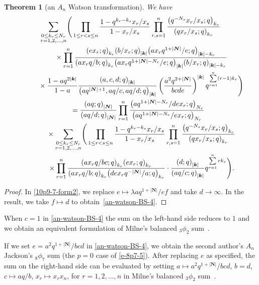 \documentclass[pdftex]{sigma}
\numberwithin{equation}{section}
\newtheorem{Theorem}{Theorem}[section]
\newcommand{\sumN}{{\left| \boldsymbol{N} \right|}}
\newcommand\sumk{{\left| \boldsymbol{k} \right|}}
\newcommand{\multsum}[3]{{\sum\limits_{\substack{{0\le #1_#3 \le #2_#3} \\
{#3 =1,2,\dots, n}}}}}
\newcommand{\qrfac}[2]{{\left({#1}; q\right)_{#2}}} %
\newcommand{\triprod}[1]{\prod\limits_{1\le r < s \le #1}}
\newcommand{\sqprod}[1]{\prod\limits_{r, s =1}^{#1}} %
\newcommand{\smallprod}[1]{\prod\limits_{r =1}^{#1}} %
\newcommand{\xover}[1]{#1_{r}/#1_{s}}
\newcommand{\vandermonde}[3]{\triprod{#3} %
 \frac{1-q^{#2_r-#2_s} \xover {#1} }{1-\xover{#1}}
}
\begin{document}
\begin{Theorem}[an $A_n$ Watson transformation] We have
\begin{gather}
\multsum{k}{N}{r} \Bigg( \vandermonde{x}{k}{n}
\sqprod n \frac{\qrfac{q^{-N_s}\xover{x}}{k_r} }{\qrfac{q\xover{x}}{k_r} } \notag \\
\qquad\quad{} \times\smallprod n \frac{\qrfac{ex_r}{k_r} \qrfac{b/x_r}{\sumk} \qrfac{ax_rq^{1+\sumN}/e}{\sumk-k_r}}
{\qrfac{ax_rq/b}{k_r}\qrfac{ax_rq^{1+\sumN-N_r}/e}{\sumk} \qrfac{b/x_r}{\sumk-k_r} }\notag \\
\qquad\quad{} \times \frac{1-aq^{2\sumk}}{1-a} \frac{\qrfac{a, c, d}{\sumk}}{\qrfac{aq^{\sumN+1}, aq/c, aq/d}{\sumk}}
 \left(\frac{a^2q^{2+\sumN}}{bcde}\right)^{\sumk} q^{\sum\limits_{r=1}^n (r-1)k_r } \Bigg)\notag \\
\qquad{} = \frac{\qrfac{aq}{\sumN}}{\qrfac{aq/d}{\sumN}}
\smallprod n \frac{\qrfac{aq^{1+\sumN-N_r}/dex_r}{N_r}}{\qrfac{aq^{1+\sumN-N_r}/ex_r}{N_r}}\notag \\
\qquad\quad{} \times \multsum{k}{N}{r} \Bigg( \vandermonde{x}{k}{n}
\sqprod n \frac{\qrfac{q^{-N_s}\xover{x}}{k_r} }{\qrfac{q\xover{x}}{k_r} } \notag \\
\qquad\quad{} \times \smallprod n \frac{\qrfac{ax_rq/bc}{k_r} \qrfac{ex_r}{k_r}}
{ \qrfac{ax_rq/b}{k_r} \qrfac{dex_rq^{-\sumN}/a}{k_r}} \cdot
\frac{\qrfac{ d}{\sumk}}{\qrfac{aq/c}{\sumk} }
q^{\sum\limits_{r=1}^n rk_r } \Bigg). \label{an-watson-BS-4}
\end{gather}
\end{Theorem}
\begin{proof} In \eqref{10p9-7-form2}, we replace $e\mapsto \lambda a q^{1+\sumN}/ef$ and take $d\to \infty$. In the result, we take $f\mapsto d$ to obtain~\eqref{an-watson-BS-4}.
\end{proof}

When $c=1$ in \eqref{an-watson-BS-4} the sum on the left-hand side reduces to $1$ and we obtain an equivalent formulation of Milne's balanced $_3\phi_2$ sum~\cite[Theorem~4.1]{Milne1997}.

If we set $e=a^2q^{1+\sumN}/bcd$ in \eqref{an-watson-BS-4}, we obtain the second author's $A_n$ Jackson's $_8\phi_7$ sum (the $p=0$ case of \eqref{e-8p7-5}). After replacing $e$ as specified, the sum on the right-hand side can be evaluated by setting $a\mapsto a^2q^{1+\sumN}/bcd$, $b=d$, $c\mapsto aq/b$, $x_r\mapsto x_rx_n$, for $r=1, 2, \dots, n$ in Milne's balanced $_3\phi_2$ sum~\cite[Theorem~4.1]{Milne1997}.
\end{document}
